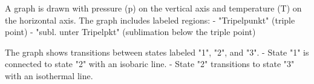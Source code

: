 A graph is drawn with pressure (p) on the vertical axis and temperature (T) on the horizontal axis. The graph includes labeled regions:  
- "Tripelpunkt" (triple point)  
- "subl. unter Tripelpkt" (sublimation below the triple point)  

The graph shows transitions between states labeled "1", "2", and "3".  
- State "1" is connected to state "2" with an isobaric line.  
- State "2" transitions to state "3" with an isothermal line.